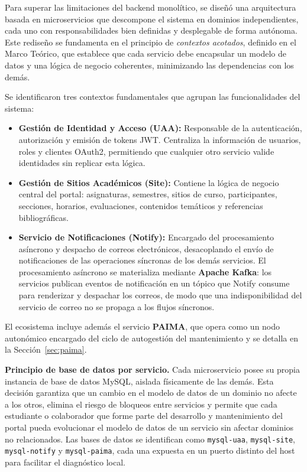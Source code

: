 Para superar las limitaciones del backend monolítico, se diseñó una arquitectura
basada en microservicios que descompone el sistema en dominios independientes, cada
uno con responsabilidades bien definidas y desplegable de forma autónoma. Este
rediseño se fundamenta en el principio de \textit{contextos acotados}, definido en el
Marco Teórico, que establece que cada servicio debe encapsular un modelo de datos y
una lógica de negocio coherentes, minimizando las dependencias con los demás.

Se identificaron tres contextos fundamentales que agrupan las funcionalidades del
sistema:

\begin{itemize}
    \item \textbf{Gestión de Identidad y Acceso (UAA):} Responsable de la
    autenticación, autorización y emisión de tokens JWT. Centraliza la información de
    usuarios, roles y clientes OAuth2, permitiendo que cualquier otro servicio valide
    identidades sin replicar esta lógica.
    \item \textbf{Gestión de Sitios Académicos (Site):} Contiene la lógica de negocio
    central del portal: asignaturas, semestres, sitios de curso, participantes,
    secciones, horarios, evaluaciones, contenidos temáticos y referencias
    bibliográficas.
    \item \textbf{Servicio de Notificaciones (Notify):} Encargado del procesamiento
    asíncrono y despacho de correos electrónicos, desacoplando el envío de
    notificaciones de las operaciones síncronas de los demás servicios. El
    procesamiento asíncrono se materializa mediante \textbf{Apache Kafka}: los
    servicios publican eventos de notificación en un tópico que Notify consume
    para renderizar y despachar los correos, de modo que una indisponibilidad del
    servicio de correo no se propaga a los flujos síncronos.
\end{itemize}

El ecosistema incluye además el servicio \textbf{PAIMA}, que opera como un nodo
autonómico encargado del ciclo de autogestión del mantenimiento y se detalla en la
Sección~\ref{sec:paima}.

\textbf{Principio de base de datos por servicio.} Cada microservicio posee su propia
instancia de base de datos MySQL, aislada físicamente de las demás. Esta decisión
garantiza que un cambio en el modelo de datos de un dominio no afecte a los otros,
elimina el riesgo de bloqueos entre servicios y permite que cada estudiante o
colaborador que forme parte del desarrollo y mantenimiento del portal pueda evolucionar
el modelo de datos de un servicio sin afectar dominios no relacionados. Las bases de
datos se identifican como \texttt{mysql-uaa}, \texttt{mysql-site},
\texttt{mysql-notify} y \texttt{mysql-paima}, cada una expuesta en un puerto distinto
del host para facilitar el diagnóstico local.

